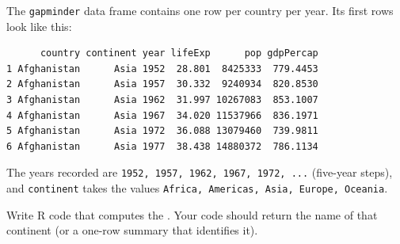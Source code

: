 \question[8]{}

The \verb|gapminder| data frame contains one row per country per year. Its first rows look like this:

\begin{verbatim}
      country continent year lifeExp      pop gdpPercap
1 Afghanistan      Asia 1952  28.801  8425333  779.4453
2 Afghanistan      Asia 1957  30.332  9240934  820.8530
3 Afghanistan      Asia 1962  31.997 10267083  853.1007
4 Afghanistan      Asia 1967  34.020 11537966  836.1971
5 Afghanistan      Asia 1972  36.088 13079460  739.9811
6 Afghanistan      Asia 1977  38.438 14880372  786.1134
\end{verbatim}

The years recorded are \verb|1952, 1957, 1962, 1967, 1972, ...| (five-year steps), and \verb|continent| takes the values \verb|Africa, Americas, Asia, Europe, Oceania|.

Write R code that computes the . Your code should return the name of that continent (or a one-row summary that identifies it).

\ifanswerspace
\vfillstretch
\fi
